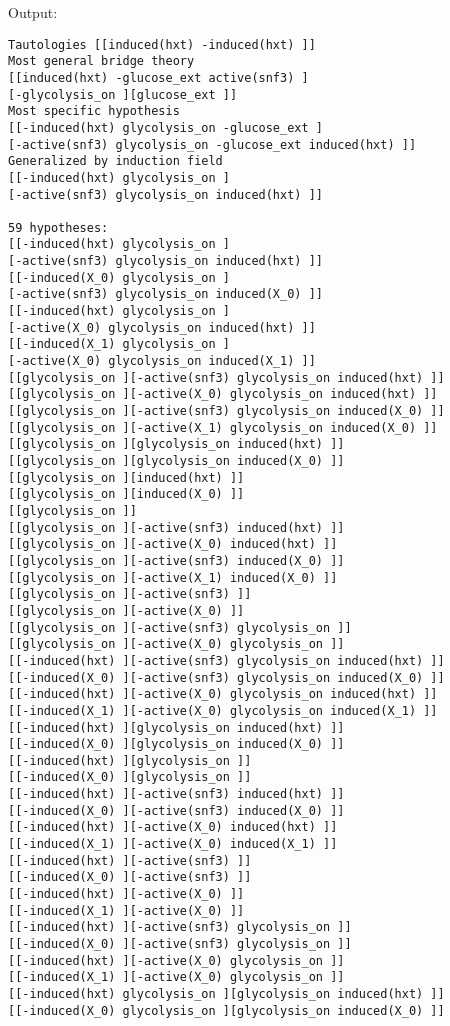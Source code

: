 Output:
\begin{lstlisting}
Tautologies [[induced(hxt) -induced(hxt) ]]
Most general bridge theory
[[induced(hxt) -glucose_ext active(snf3) ]
[-glycolysis_on ][glucose_ext ]]
Most specific hypothesis
[[-induced(hxt) glycolysis_on -glucose_ext ]
[-active(snf3) glycolysis_on -glucose_ext induced(hxt) ]]
Generalized by induction field
[[-induced(hxt) glycolysis_on ]
[-active(snf3) glycolysis_on induced(hxt) ]]

59 hypotheses:
[[-induced(hxt) glycolysis_on ]
[-active(snf3) glycolysis_on induced(hxt) ]]
[[-induced(X_0) glycolysis_on ]
[-active(snf3) glycolysis_on induced(X_0) ]]
[[-induced(hxt) glycolysis_on ]
[-active(X_0) glycolysis_on induced(hxt) ]]
[[-induced(X_1) glycolysis_on ]
[-active(X_0) glycolysis_on induced(X_1) ]]
[[glycolysis_on ][-active(snf3) glycolysis_on induced(hxt) ]]
[[glycolysis_on ][-active(X_0) glycolysis_on induced(hxt) ]]
[[glycolysis_on ][-active(snf3) glycolysis_on induced(X_0) ]]
[[glycolysis_on ][-active(X_1) glycolysis_on induced(X_0) ]]
[[glycolysis_on ][glycolysis_on induced(hxt) ]]
[[glycolysis_on ][glycolysis_on induced(X_0) ]]
[[glycolysis_on ][induced(hxt) ]]
[[glycolysis_on ][induced(X_0) ]]
[[glycolysis_on ]]
[[glycolysis_on ][-active(snf3) induced(hxt) ]]
[[glycolysis_on ][-active(X_0) induced(hxt) ]]
[[glycolysis_on ][-active(snf3) induced(X_0) ]]
[[glycolysis_on ][-active(X_1) induced(X_0) ]]
[[glycolysis_on ][-active(snf3) ]]
[[glycolysis_on ][-active(X_0) ]]
[[glycolysis_on ][-active(snf3) glycolysis_on ]]
[[glycolysis_on ][-active(X_0) glycolysis_on ]]
[[-induced(hxt) ][-active(snf3) glycolysis_on induced(hxt) ]]
[[-induced(X_0) ][-active(snf3) glycolysis_on induced(X_0) ]]
[[-induced(hxt) ][-active(X_0) glycolysis_on induced(hxt) ]]
[[-induced(X_1) ][-active(X_0) glycolysis_on induced(X_1) ]]
[[-induced(hxt) ][glycolysis_on induced(hxt) ]]
[[-induced(X_0) ][glycolysis_on induced(X_0) ]]
[[-induced(hxt) ][glycolysis_on ]]
[[-induced(X_0) ][glycolysis_on ]]
[[-induced(hxt) ][-active(snf3) induced(hxt) ]]
[[-induced(X_0) ][-active(snf3) induced(X_0) ]]
[[-induced(hxt) ][-active(X_0) induced(hxt) ]]
[[-induced(X_1) ][-active(X_0) induced(X_1) ]]
[[-induced(hxt) ][-active(snf3) ]]
[[-induced(X_0) ][-active(snf3) ]]
[[-induced(hxt) ][-active(X_0) ]]
[[-induced(X_1) ][-active(X_0) ]]
[[-induced(hxt) ][-active(snf3) glycolysis_on ]]
[[-induced(X_0) ][-active(snf3) glycolysis_on ]]
[[-induced(hxt) ][-active(X_0) glycolysis_on ]]
[[-induced(X_1) ][-active(X_0) glycolysis_on ]]
[[-induced(hxt) glycolysis_on ][glycolysis_on induced(hxt) ]]
[[-induced(X_0) glycolysis_on ][glycolysis_on induced(X_0) ]]

\end{lstlisting}
